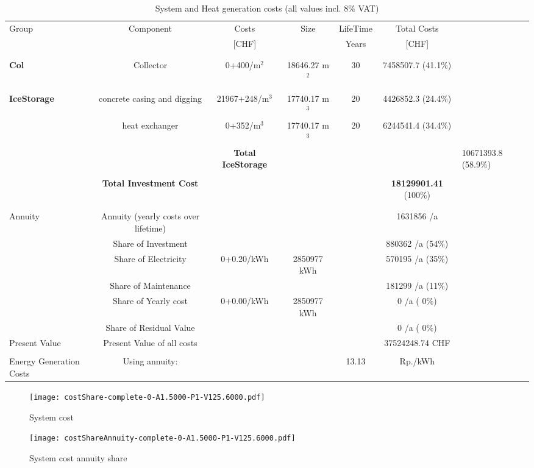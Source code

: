 \documentclass[english]{SPFShortReport}
\begin{document}
\begin{table}[!ht]
\centering
\caption{System and Heat generation costs (all values incl. 8$\%$ VAT) }
\begin{adjustbox}{max width =\textwidth}
\begin{tabular}{l | c c c c c } 
\hline
\hline
Group &Component &Costs &Size &LifeTime &Total Costs \\ 
 & &[CHF] & &Years &[CHF]\\ 
\hline
\\
\hline \\
\textbf{Col} & Collector & 0+400/m$^2$ & 18646.27 m$^2$ & 30 & 7458507.7 (41.1\%) \\
\hline \\
\hline \\
\textbf{IceStorage} & concrete casing and digging & 21967+248/m$^3$ & 17740.17 m$^3$ & 20 & 4426852.3 (24.4\%) \\
 & heat exchanger & 0+352/m$^3$ & 17740.17 m$^3$ & 20 & 6244541.4 (34.4\%) \\
&
 & \textbf{Total IceStorage} & & & & 10671393.8 (58.9\%) \\
\hline \\
 & \textbf{Total Investment Cost} & & & & \textbf{18129901.41} (100\%) \\ 
\hline \\ 
\hline \\ 
Annuity & Annuity (yearly costs over lifetime)  &&& & 1631856 /a  \\
 & Share of Investment & &&& 880362 /a (54\%) \\
 & Share of Electricity & 0+0.20/kWh & 2850977 kWh &  & 570195 /a (35\%)\\
 & Share of Maintenance & &&& 181299 /a (11\%)\\ 
 & Share of Yearly cost & 0+0.00/kWh & 2850977 kWh & &  0 /a ( 0\%)\\
 & Share of Residual Value &&& &  0 /a ( 0\%)\\
Present Value  & Present Value of all costs  & &&& 37524248.74 CHF \\
\hline \\ 
 Energy Generation Costs & Using annuity: &&& 13.13 & Rp./kWh \\
\hline
\hline
\end{tabular}
\end{adjustbox}
\label{CostsTable}
\end{table}
\begin{figure}[!htbp]
\begin{center}
\texttt{[image: costShare-complete-0-A1.5000-P1-V125.6000.pdf]}
\caption{System cost}
\label{systemCost}
\end{center}
\end{figure}
\begin{figure}[!htbp]
\begin{center}
\texttt{[image: costShareAnnuity-complete-0-A1.5000-P1-V125.6000.pdf]}
\caption{System cost annuity share}
\label{systemCostannuity}
\end{center}
\end{figure}
\end{document}
